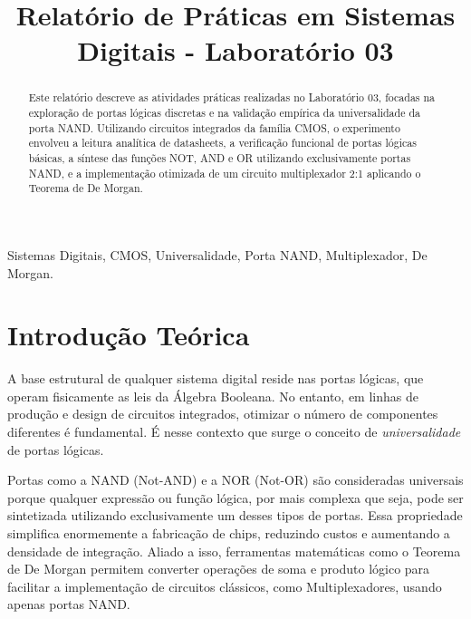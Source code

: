 \documentclass[conference]{IEEEtran}
\begin{document}
\title{Relatório de Práticas em Sistemas Digitais - Laboratório 03}

\author{
}

\maketitle

\begin{abstract}
Este relatório descreve as atividades práticas realizadas no Laboratório 03, focadas na exploração de portas lógicas discretas e na validação empírica da universalidade da porta NAND. Utilizando circuitos integrados da família CMOS, o experimento envolveu a leitura analítica de datasheets, a verificação funcional de portas lógicas básicas, a síntese das funções NOT, AND e OR utilizando exclusivamente portas NAND, e a implementação otimizada de um circuito multiplexador 2:1 aplicando o Teorema de De Morgan.
\end{abstract}

\begin{IEEEkeywords}
Sistemas Digitais, CMOS, Universalidade, Porta NAND, Multiplexador, De Morgan.
\end{IEEEkeywords}

\section{Introdução Teórica}
A base estrutural de qualquer sistema digital reside nas portas lógicas, que operam fisicamente as leis da Álgebra Booleana. No entanto, em linhas de produção e design de circuitos integrados, otimizar o número de componentes diferentes é fundamental. É nesse contexto que surge o conceito de \textit{universalidade} de portas lógicas.

Portas como a NAND (Not-AND) e a NOR (Not-OR) são consideradas universais porque qualquer expressão ou função lógica, por mais complexa que seja, pode ser sintetizada utilizando exclusivamente um desses tipos de portas. Essa propriedade simplifica enormemente a fabricação de chips, reduzindo custos e aumentando a densidade de integração. Aliado a isso, ferramentas matemáticas como o Teorema de De Morgan permitem converter operações de soma e produto lógico para facilitar a implementação de circuitos clássicos, como Multiplexadores, usando apenas portas NAND.
\end{document}
